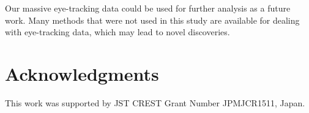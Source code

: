 \documentclass{vgtc}                          %
\begin{document}
Our massive eye-tracking data could be used for further analysis as a future work.
Many methods that were not used in this study are available for dealing with eye-tracking data, which may lead to novel discoveries.

\section{Acknowledgments}
This work was supported by JST CREST Grant Number JPMJCR1511, Japan.


%

%
%
%


\end{document}
